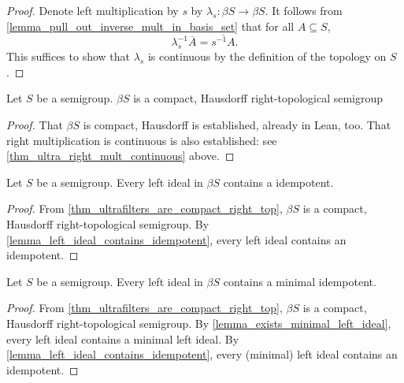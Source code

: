 \begin{proof}
\leanok{}
    Denote left multiplication by $s$ by $\lambda_s: \beta S \to \beta S$.  It follows from \cref{lemma_pull_out_inverse_mult_in_basis_set} that for all $A \subseteq S$,
    \[\lambda_s^{-1} \overline{A} = \overline{s^{-1} A}.\]
    This suffices to show that $\lambda_s$ is continuous by the definition of the topology on $S$.
\end{proof}

\begin{theorem}
\label{thm_ultrafilters_are_compact_right_top}
    Let $S$ be a semigroup.  $\beta S$ is a compact, Hausdorff right-topological semigroup
\end{theorem}

\begin{proof}
    That $\beta S$ is compact, Hausdorff is established, already in Lean, too.  That right multiplication is continuous is also established: see \cref{thm_ultra_right_mult_continuous} above.
\end{proof}

\begin{lemma}
\label{lemma_exists_idempotent_in_left_ideals}
    Let $S$ be a semigroup.  Every left ideal in $\beta S$ contains a idempotent.
\end{lemma}


\begin{proof}
    From \cref{thm_ultrafilters_are_compact_right_top}, $\beta S$ is a compact, Hausdorff right-topological semigroup.  By \cref{lemma_left_ideal_contains_idempotent}, every left ideal contains an idempotent.
\end{proof}

\begin{lemma}
\label{lemma_exists_minimal_idempotent_in_left_ideals}
\leanok{}
    Let $S$ be a semigroup.  Every left ideal in $\beta S$ contains a minimal idempotent.
\end{lemma}

\begin{proof}
\leanok{}
    From \cref{thm_ultrafilters_are_compact_right_top}, $\beta S$ is a compact, Hausdorff right-topological semigroup.  By \cref{lemma_exists_minimal_left_ideal}, every left ideal contains a minimal left ideal.  By \cref{lemma_left_ideal_contains_idempotent}, every (minimal) left ideal contains an idempotent.
\end{proof}

